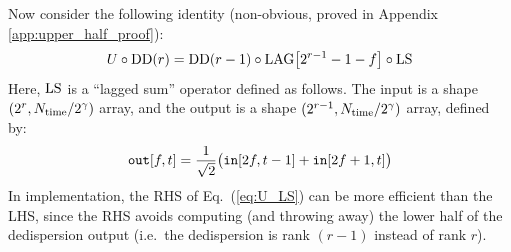 \documentclass{article}
\numberwithin{equation}{section}   %
\def\DD{{\rm DD}}
\def\LS{{\rm LS}}
\def\LAG{{\rm LAG}}
\begin{document}
Now consider the following identity (non-obvious, proved in Appendix \ref{app:upper_half_proof}):
\begin{equation}
U \circ \DD(r) = \DD(r-1) \circ \LAG\big[ 2^{r-1} - 1 - f\big] \circ \LS
\label{eq:U_LS}
\end{equation}
Here, $\LS$ is a ``lagged sum'' operator defined as follows. The input is a shape
$(2^r,N_{\rm time}/2^\gamma)$ array, and the output is a shape
$(2^{r-1},N_{\rm time}/2^\gamma)$ array, defined by:
\begin{equation}
{\tt out}[f,t] = \frac{1}{\sqrt{2}} \big( {\tt in}[2f,t-1] + {\tt in}[2f+1,t] \big)
\label{eq:LS_def}
\end{equation}
In implementation, the RHS of Eq.\ (\ref{eq:U_LS}) can be more efficient than the LHS,
since the RHS avoids computing (and throwing away) the lower half of the dedispersion
output (i.e.\ the dedispersion is rank $(r-1)$ instead of rank $r$).
\end{document}
